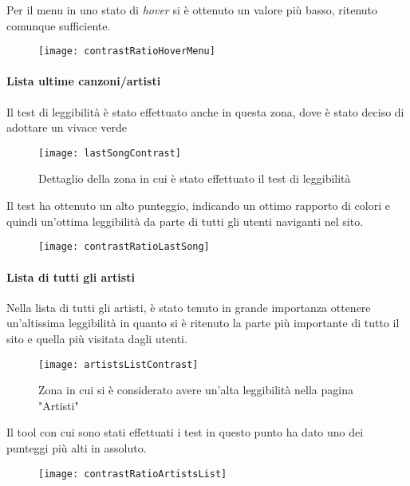 Per il menu in uno stato di \textit{hover} si è ottenuto un valore più basso, ritenuto comunque sufficiente.
\begin{figure}[H]

    \centering
    \texttt{[image: contrastRatioHoverMenu]}

\end{figure}


\paragraph*{Lista ultime canzoni/artisti}Il test di leggibilità è stato effettuato anche in questa zona, dove è stato deciso di adottare un vivace verde
\begin{figure}[H]

    \centering
    \texttt{[image: lastSongContrast]}
    \caption{Dettaglio della zona in cui è stato effettuato il test di leggibilità}

\end{figure}

Il test ha ottenuto un alto punteggio, indicando un ottimo rapporto di colori e quindi un'ottima leggibilità da parte di tutti gli utenti naviganti nel sito.
\begin{figure}[H]

    \centering
    \texttt{[image: contrastRatioLastSong]}

\end{figure}

\paragraph*{Lista di tutti gli artisti}Nella lista di tutti gli artisti, è stato tenuto in grande importanza ottenere un'altissima leggibilità in quanto si è ritenuto la parte più importante di tutto il sito e quella più visitata dagli utenti.

\begin{figure}[H]

    \centering
    \texttt{[image: artistsListContrast]}
    \caption{Zona in cui si è considerato avere un'alta leggibilità nella pagina "Artisti"}

\end{figure}

Il tool con cui sono stati effettuati i test in questo punto ha dato uno dei punteggi più alti in assoluto.
\begin{figure}[H]

    \centering
    \texttt{[image: contrastRatioArtistsList]}

\end{figure}

